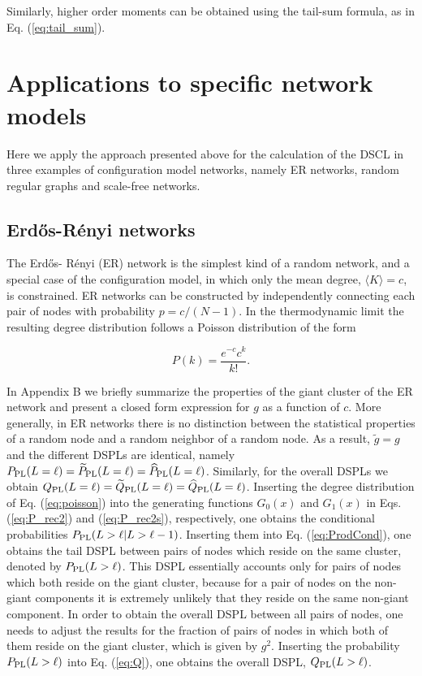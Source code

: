 \documentclass[preprint,pre,superscriptaddress,showpacs]{revtex4}
\begin{document}
\noindent
Similarly, higher order moments can be obtained using
the tail-sum formula, as in Eq. (\ref{eq:tail_sum}).



\section{Applications to specific network models}

Here we apply the approach presented above for the calculation of the
DSCL in three examples of configuration model networks, namely 
ER networks, random regular graphs 
and scale-free networks.

\subsection{Erd{\H o}s-R\'enyi networks}

The Erd\H{o}s- R\'enyi (ER) network is the simplest kind of
a random network, 
and a special case of the configuration model,
in which only the mean degree,
$\langle K \rangle = c$, is constrained.
ER networks can be constructed by independently connecting
each pair of nodes with probability
$p = {c}/{(N-1)}$.
In the thermodynamic limit the resulting degree distribution follows a
Poisson distribution of the form

\begin{equation}
P(k) = \frac{e^{-c} c^k}{k!}.
\label{eq:poisson}
\end{equation}

\noindent
In Appendix B we briefly summarize the properties of the giant cluster of
the ER network and present a closed form expression
for $g$ as a function of $c$.
More generally, in ER
networks there is no distinction between 
the statistical properties of a random node and a random neighbor
of a random node.
As a result, 
$\tilde g = g$ and the different DSPLs are identical,
namely 
$P_{\rm PL}(L=\ell) 
= {\widetilde P}_{\rm PL}(L=\ell) = \widehat P_{\rm PL}(L=\ell)$.
Similarly, for the overall DSPLs we obtain
$Q_{\rm PL}(L=\ell) 
= {\widetilde Q}_{\rm PL}(L=\ell) = \widehat Q_{\rm PL}(L=\ell)$.
Inserting the degree distribution 
of Eq. (\ref{eq:poisson})
into the generating functions
$G_0(x)$ and $G_1(x)$ in 
Eqs. (\ref{eq:P_rec2}) and (\ref{eq:P_rec2s}),
respectively, one obtains the conditional probabilities
$P_{\rm PL}(L>\ell | L>\ell-1)$.
Inserting them into 
Eq. (\ref{eq:ProdCond}),
one obtains the tail DSPL
between pairs of nodes which reside on the same cluster,
denoted by $P_{\rm PL}(L > \ell)$.
This DSPL essentially accounts only for pairs of nodes which
both reside on the giant cluster, because for a pair of nodes on
the non-giant components it is extremely unlikely that they reside on the
same non-giant component.
In order to obtain the overall DSPL between all pairs of
nodes, one needs to adjust the results for the fraction of pairs of
nodes in which both of them reside on the giant cluster, which is
given by $g^2$. Inserting the probability $P_{\rm PL}(L > \ell)$
into Eq. (\ref{eq:Q}), one obtains the overall DSPL,
$Q_{\rm PL}(L>\ell)$.
\end{document}

